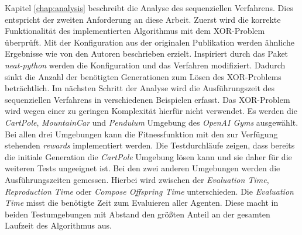 Kapitel \ref{chap:analysis} beschreibt die Analyse des sequenziellen Verfahrens. Dies entspricht der zweiten Anforderung an diese Arbeit. Zuerst wird die korrekte Funktionalität des implementierten Algorithmus mit dem XOR-Problem überprüft. Mit der Konfiguration aus der originalen Publikation werden ähnliche Ergebnisse wie von den Autoren beschrieben erzielt. Inspiriert durch das Paket \emph{neat-python} werden die Konfiguration und das Verfahren modifiziert. Dadurch sinkt die Anzahl der benötigten Generationen zum Lösen des XOR-Problems beträchtlich. Im nächsten Schritt der Analyse wird die Ausführungszeit des sequenziellen Verfahrens in verschiedenen Beispielen erfasst. Das XOR-Problem wird wegen einer zu geringen Komplexität hierfür nicht verwendet. Es werden die \emph{CartPole}, \emph{MountainCar} und \emph{Pendulum} Umgebung des \emph{OpenAI Gyms} ausgewählt. Bei allen drei Umgebungen kann die Fitnessfunktion mit den zur Verfügung stehenden \emph{rewards} implementiert werden. Die Testdurchläufe zeigen, dass bereits die initiale Generation die \emph{CartPole} Umgebung lösen kann und sie daher für die weiteren Tests ungeeignet ist. Bei den zwei anderen Umgebungen werden die Ausführungszeiten gemessen. Hierbei wird zwischen der \emph{Evaluation Time}, \emph{Reproduction Time} oder \emph{Compose Offspring Time} unterschieden. Die \emph{Evaluation Time} misst die benötigte Zeit zum Evaluieren aller Agenten. Diese macht in beiden Testumgebungen mit Abstand den größten Anteil an der gesamten Laufzeit des Algorithmus aus.
\\\\
